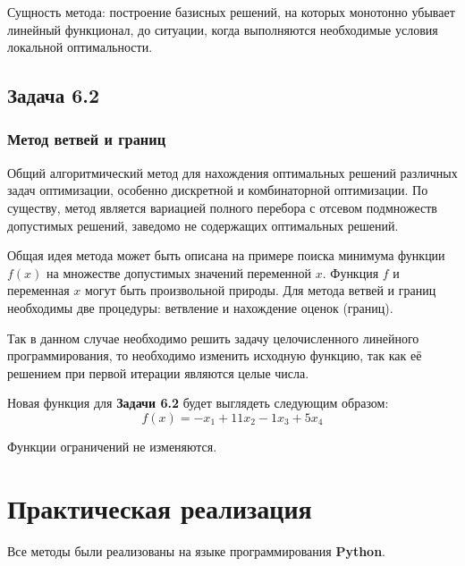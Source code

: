 \documentclass[a4paper, 12pt]{article}   	%
\begin{document}
        Сущность метода: построение базисных решений, на которых монотонно убывает линейный функционал, до ситуации, когда выполняются необходимые условия локальной оптимальности.

\subsection{Задача 6.2}

    \subsubsection{Метод ветвей и границ}
    Общий алгоритмический метод для нахождения оптимальных решений различных задач оптимизации, особенно дискретной и комбинаторной оптимизации. По существу, метод является вариацией полного перебора с отсевом подмножеств допустимых решений, заведомо не содержащих оптимальных решений.
    
    Общая идея метода может быть описана на примере поиска минимума функции $f(x)$ на множестве допустимых значений переменной $x$. Функция $f$ и переменная $x$ могут быть произвольной природы. Для метода ветвей и границ необходимы две процедуры: ветвление и нахождение оценок (границ).
    
    Так в данном случае необходимо решить задачу целочисленного линейного программирования, то необходимо изменить исходную функцию, так как её решением при первой итерации являются целые числа.
    
    Новая функция для \textbf{Задачи 6.2} будет выглядеть следующим образом:
    \begin{equation}
        f(x) = - x_1 + 11 x_2 - 1 x_3 + 5x_4
    \end{equation}
    
    Функции ограничений не изменяются.
    
\newpage

\section{Практическая реализация}

    Все методы были реализованы на языке программирования \textbf{Python}. 
\end{document}

